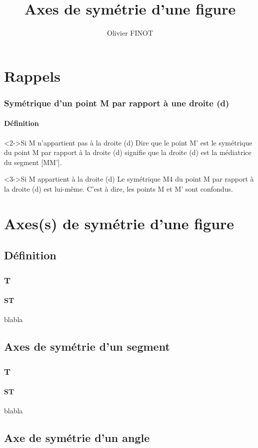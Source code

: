 \documentclass{beamer}
\title{Axes de symétrie d'une figure}
\author{Olivier FINOT}\institute{Collège Jules Ferry, Beaune}
\begin{document}
\begin{frame}
  \titlepage
\end{frame}


\section{Rappels}

\begin{frame}
\frametitle{Symétrique d'un point M par rapport à une droite (d)}  
\framesubtitle{Définition}

\begin{alertblock}<2->{Si M n'appartient pas à la droite (d)}
Dire que le point M' est le symétrique du point M par rapport à la droite (d) signifie que la droite (d) est la médiatrice du segment [MM'].
\end{alertblock}

\begin{alertblock}<3->{Si M appartient à la droite (d)}
Le symétrique M4 du point M par rapport à la droite (d) est lui-même.
C'est à dire, les points M et M' sont confondus.
\end{alertblock}

\end{frame}

\section{Axes(s) de symétrie d'une figure}

\subsection{Définition}

\begin{frame}
\frametitle{T}  
\framesubtitle{ST}
blabla
\end{frame}

\subsection{Axes de symétrie d'un segment}

\begin{frame}
\frametitle{T}  
\framesubtitle{ST}
blabla
\end{frame}

\subsection{Axe de symétrie d'un angle}
\end{document}
